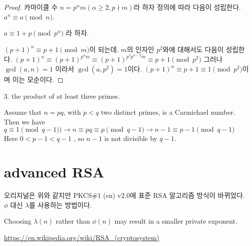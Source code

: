 \begin{proof}
카마이클 수 $n = p^\alpha m( \alpha \ge 2 ,  p \nmid m )$라 하자
정의에 따라 다음이 성립한다. 
$a^{n} \equiv a \pmod{n}$.

$ a \equiv 1 + p \pmod{p^\alpha}$ 라 하자.

$(p+1)^{n} \equiv p+1 \pmod{m}$이 되는데. 
$m$의 인자인 $p^2$와에 대해서도 다음이 성립한다.
$(p+1)^{n} \equiv (p+1)^{p^\alpha m} \equiv (p+1)^{p^2 p^{\alpha-2} m}  \equiv p+1 \pmod{p^2}$
그러나 $\gcd(a,n) = 1$ 이라서 $\gcd(a, p^2) = 1$이다.
$(p+1)^{n} \equiv p+1  \equiv 1 \pmod{p^2}$이며 이는 모순이다.
\end{proof}



3. the product of at least three primes. 



Assume that $n=pq$, with $p<q$ two distinct primes, is a Carmichael number. 
Then we have 
$q≡1 \pmod{q−1} )\rightarrow n \equiv pq \equiv p \pmod{q−1}  \rightarrow n−1 \equiv p−1 \pmod{q−1}$
Here $0 < p−1 < q−1$ , so $n−1$ is not divisible by $q−1$.



\section{advanced RSA}


오리지널은 위와 같지만  PKCS$\#$1 (en) v2.0에 표준 RSA 알고리즘 방식이 바뀌었다.
$\phi$ 대신 $\lambda$를 사용하는 방법이다.

Choosing $\lambda(n)$ rather than $\phi(n)$ may result in a smaller private exponent.


\url{https://en.wikipedia.org/wiki/RSA_(cryptosystem)}

